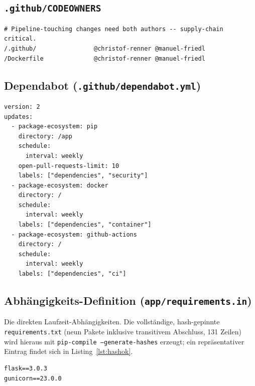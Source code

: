 \documentclass[12pt, a4paper]{scrartcl}
\begin{document}
\subsection{\texttt{.github/CODEOWNERS}}
\begin{lstlisting}
# Pipeline-touching changes need both authors -- supply-chain critical.
/.github/                @christof-renner @manuel-friedl
/Dockerfile              @christof-renner @manuel-friedl
\end{lstlisting}

\subsection{Dependabot (\texttt{.github/dependabot.yml})}
\begin{lstlisting}
version: 2
updates:
  - package-ecosystem: pip
    directory: /app
    schedule:
      interval: weekly
    open-pull-requests-limit: 10
    labels: ["dependencies", "security"]
  - package-ecosystem: docker
    directory: /
    schedule:
      interval: weekly
    labels: ["dependencies", "container"]
  - package-ecosystem: github-actions
    directory: /
    schedule:
      interval: weekly
    labels: ["dependencies", "ci"]
\end{lstlisting}

\subsection{Abhängigkeits-Definition (\texttt{app/requirements.in})}\label{app:reqs}
Die direkten Laufzeit-Abhängigkeiten. Die vollständige, hash-gepinnte
\texttt{requirements.txt} (neun Pakete inklusive transitivem Abschluss,
131 Zeilen) wird hieraus mit
\texttt{pip-compile --generate-hashes} erzeugt; ein repräsentativer
Eintrag findet sich in Listing~\ref{lst:hashok}.
\begin{lstlisting}[caption={Direkte Abhängigkeiten (Lockfile-Quelle)},label={lst:reqsin}]
flask==3.0.3
gunicorn==23.0.0
\end{lstlisting}
\end{document}
